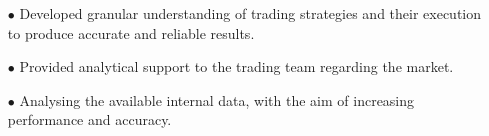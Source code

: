 \documentclass[10pt,a4paper,ragged2e]{altacv}
\begin{document}
\begin{comment}
\cvsection{Co-curricular/ Events}
\smallskip
\large{\textbf{SRM Annual Research Day 2019}}
\begin{itemize}
\item[\faTrophy] Participated in 'SRM Research Day 2019', held on 26th February 2019 held by SRM IST and successfully bagged Silver Medal for Research Paper in Computer Science and Engineering Department.
\end{itemize}
\smallskip
\large{\textbf{HSC Merit Scholarship}}
\begin{itemize}
\item[\faTrophy] Scored more than 90\% in PCM (Physics, Chemistry, Maths) in 12th board examinations and got selected for the scholarship program by SRM wherein the students are given concessions on the college tution fees.
\end{itemize}
\smallskip
\large{\textbf{Rotary Interact Member 2017-18}}
\begin{itemize}
\item[\faTrophy]Organized projects all round the year that helped our school and community and that promoted international understanding. Held the post of Project Director for various successful projects that spanned from visiting Old-Age homes to interacting with children at special needs schools.

Took part in Rotary Youth Leadership program. Helped organize events and interacted with numerous luminaries.
\end{itemize}
\smallskip
\large{\textbf{National Cyber Olympiad 2018 and National Science Olympiad 2018}}
\begin{itemize}
\item[\faTrophy]Secured a world rank of 71 in National Cyber Olympiad 2018. 

Got selected for the Round 2 in NSO after clearing Problem Solving and Science Questionnaire stage, held by Science Olympiad Foundation.\\
\end{itemize}
\smallskip
\end{comment}

\begin{itemize}
    \item [$\bullet$]Developed granular understanding of trading strategies and their execution to produce accurate and reliable results.
    \item [$\bullet$]Provided analytical support to the trading team regarding the market.
    \item [$\bullet$]Analysing the available internal data, with the aim of increasing performance and accuracy.
    
\end{itemize}
\end{document}

